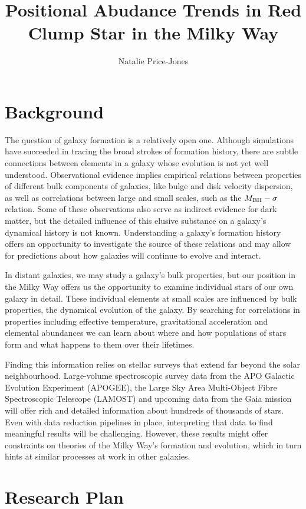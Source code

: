 \documentclass[manuscript]{aastex}
\begin{document}
\title{Positional Abudance Trends in Red Clump Star in the Milky Way}
\author{Natalie Price-Jones}

\section{Background}
\label{sec:back}
The question of galaxy formation is a relatively open one. Although simulations have succeeded in tracing the broad strokes of formation history, there are subtle connections between elements in a galaxy whose evolution is not yet well understood. Observational evidence implies empirical relations between properties of different bulk components of galaxies, like bulge and disk velocity dispersion, as well as correlations between large and small scales, such as the $M_{\rm BH}-\sigma$ relation. Some of these observations also serve as indirect evidence for dark matter, but the detailed influence of this elusive substance on a galaxy's dynamical history is not known. Understanding a galaxy's formation history offers an opportunity to investigate the source of these relations and may allow for predictions about how galaxies will continue to evolve and interact.

In distant galaxies, we may study a galaxy's bulk properties, but our position in the Milky Way offers us the opportunity to examine individual stars of our own galaxy in detail. These individual elements at small scales are influenced by bulk properties, the dynamical evolution of the galaxy. By searching for correlations in properties including effective temperature, gravitational acceleration and elemental abundances we can learn about where and how populations of stars form and what happens to them over their lifetimes. 

Finding this information relies on stellar surveys that extend far beyond the solar neighbourhood. Large-volume spectroscopic survey data from the APO Galactic Evolution Experiment (APOGEE), the Large Sky Area Multi-Object Fibre Spectroscopic Telescope (LAMOST) and upcoming data from the Gaia mission will offer rich and detailed information about hundreds of thousands of stars. Even with data reduction pipelines in place, interpreting that data to find meaningful results will be challenging. However, these results might offer constraints on theories of the Milky Way's formation and evolution, which in turn hints at similar processes at work in other galaxies.  


\section{Research Plan}
\label{sec:rp}
\end{document}
